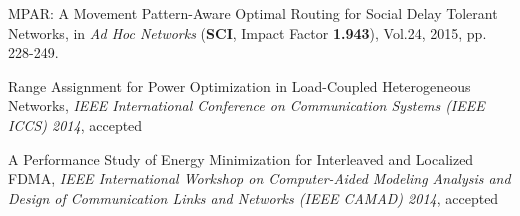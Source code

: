


\begin{publications}{99}

%


\item MPAR: A Movement Pattern-Aware Optimal Routing for Social Delay Tolerant Networks, in \textit{Ad Hoc Networks} (\textbf{SCI}, Impact Factor \textbf{1.943}), Vol.24, 2015, pp. 228-249.

%

\item Range Assignment for Power Optimization in Load-Coupled Heterogeneous Networks, \textit{IEEE International Conference on Communication Systems (IEEE ICCS) 2014}, accepted

%

\item A Performance Study of Energy Minimization for Interleaved and Localized FDMA, \textit{IEEE International Workshop on Computer-Aided Modeling Analysis and Design of Communication Links and Networks (IEEE CAMAD) 2014}, accepted



\end{publications}
